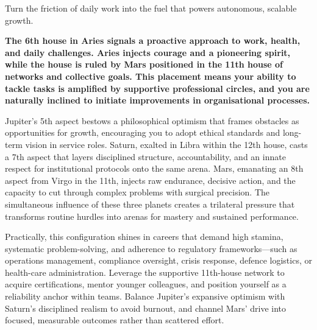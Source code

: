 {\fontsize{9}{13}\selectfont Turn the friction of daily work into the fuel that powers autonomous, scalable growth.}\par\vspace{1.8mm}


\label{topic16}

{\fontsize{9.5}{13.8}\selectfont\bfseries\color{DeepSlate} The 6th house in Aries signals a proactive approach to work, health, and daily challenges. Aries injects courage and a pioneering spirit, while the house is ruled by Mars positioned in the 11th house of networks and collective goals. This placement means your ability to tackle tasks is amplified by supportive professional circles, and you are naturally inclined to initiate improvements in organisational processes.}\par\vspace{2mm}

{\fontsize{9}{13}\selectfont Jupiter's 5th aspect bestows a philosophical optimism that frames obstacles as opportunities for growth, encouraging you to adopt ethical standards and long-term vision in service roles. Saturn, exalted in Libra within the 12th house, casts a 7th aspect that layers disciplined structure, accountability, and an innate respect for institutional protocols onto the same arena. Mars, emanating an 8th aspect from Virgo in the 11th, injects raw endurance, decisive action, and the capacity to cut through complex problems with surgical precision. The simultaneous influence of these three planets creates a trilateral pressure that transforms routine hurdles into arenas for mastery and sustained performance.}\par\vspace{1.8mm}

{\fontsize{9}{13}\selectfont Practically, this configuration shines in careers that demand high stamina, systematic problem-solving, and adherence to regulatory frameworks---such as operations management, compliance oversight, crisis response, defence logistics, or health-care administration. Leverage the supportive 11th-house network to acquire certifications, mentor younger colleagues, and position yourself as a reliability anchor within teams. Balance Jupiter's expansive optimism with Saturn's disciplined realism to avoid burnout, and channel Mars' drive into focused, measurable outcomes rather than scattered effort.}\par\vspace{1.8mm}

